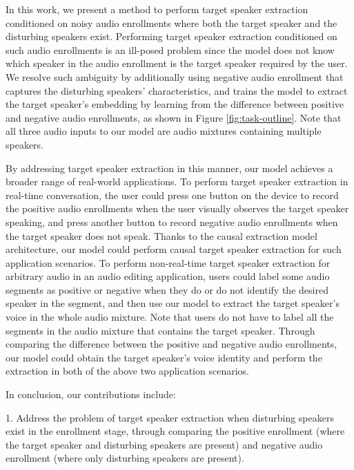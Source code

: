 In this work, we present a method to perform target speaker extraction conditioned on noisy audio enrollments where both the target speaker and the disturbing speakers exist. Performing target speaker extraction conditioned on such audio enrollments is an ill-posed problem since the model does not know which speaker in the audio enrollment is the target speaker required by the user. We resolve such ambiguity by additionally using negative audio enrollment that captures the disturbing speakers' characteristics, and trains the model to extract the target speaker's embedding by learning from the difference between positive and negative audio enrollments, as shown in Figure \ref{fig:task-outline}. Note that all three audio inputs to our model are audio mixtures containing multiple speakers. 

By addressing target speaker extraction in this manner, our model achieves a broader range of real-world applications. To perform target speaker extraction in real-time conversation, the user could press one button on the device to record the positive audio enrollments when the user visually observes the target speaker speaking, and press another button to record negative audio enrollments when the target speaker does not speak. Thanks to the causal extraction model architecture, our model could perform causal target speaker extraction for such application scenarios. 
To perform non-real-time target speaker extraction for arbitrary audio in an audio editing application, users could label some audio segments as positive or negative when they do or do not identify the desired speaker in the segment, and then use our model to extract the target speaker's voice in the whole audio mixture. Note that users do not have to label all the segments in the audio mixture that contains the target speaker. 
Through comparing the difference between the positive and negative audio enrollments, our model could obtain the target speaker's voice identity and perform the extraction in both of the above two application scenarios.

In conclusion, our contributions include: 

1. Address the problem of target speaker extraction when disturbing speakers exist in the enrollment stage, through comparing the positive enrollment (where the target speaker and disturbing speakers are present) and negative audio enrollment (where only disturbing speakers are present).

